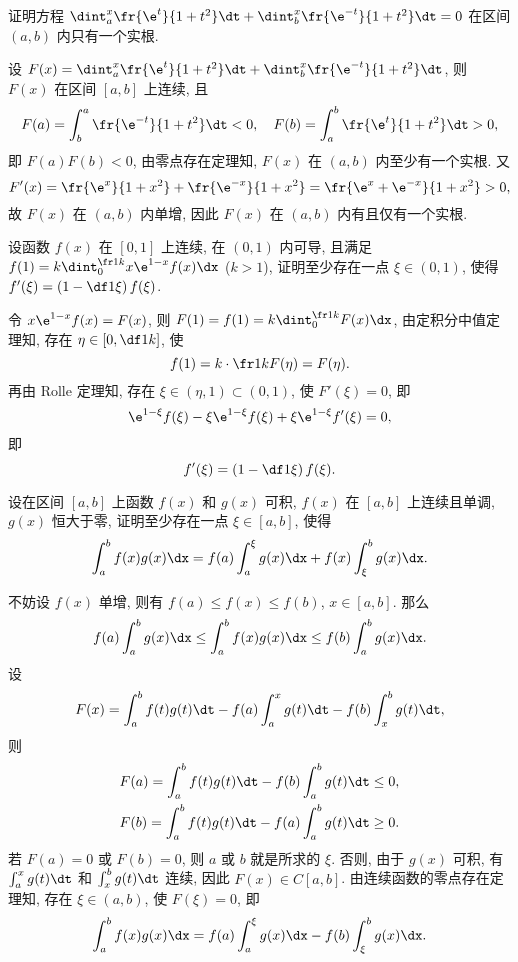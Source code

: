\documentclass{ctexart}
\begin{document}
\begin{exercise}
    证明方程 $\dint_a^x\fr{\e^t}{1+t^2}\dt+\dint_b^x\fr{\e^{-t}}{1+t^2}\dt=0$ 在区间 $(a,b)$ 内只有一个实根.
\end{exercise}

\begin{solution}
    设 $F(x)=\dint_a^x\fr{\e^t}{1+t^2}\dt+\dint_b^x\fr{\e^{-t}}{1+t^2}\dt$, 则 $F(x)$ 在区间 $[a,b]$ 上连续, 且 \[
        F(a)=\int_b^a\fr{\e^{-t}}{1+t^2}\dt<0,\quad F(b)=\int_a^b\fr{\e^t}{1+t^2}\dt>0,
    \] 即 $F(a)F(b)<0$, 由零点存在定理知, $F(x)$ 在 $(a,b)$ 内至少有一个实根. 又 \[
        F'(x)=\fr{\e^x}{1+x^2}+\fr{\e^{-x}}{1+x^2}=\fr{\e^x+\e^{-x}}{1+x^2}>0,
    \] 故 $F(x)$ 在 $(a,b)$ 内单增, 因此 $F(x)$ 在 $(a,b)$ 内有且仅有一个实根.
\end{solution}

\begin{exercise}
    设函数 $f(x)$ 在 $[0,1]$ 上连续, 在 $(0,1)$ 内可导, 且满足 $f(1)=k\dint_0^{\fr1k}x\e^{1-x}f(x)\dx$ ($k>1$), 证明至少存在一点 $\xi\in(0,1)$, 使得 $f'(\xi)=\left(1-\df1\xi\right)f(\xi)$.
\end{exercise}

\begin{solution}
    令 $x\e^{1-x}f(x)=F(x)$, 则 $F(1)=f(1)=k\dint_0^{\fr1k}F(x)\dx$, 由定积分中值定理知, 存在 $\eta\in\left[0,\df1k\right]$, 使 \[
        f(1)=k\cdot\fr1kF(\eta)=F(\eta).
    \] 再由 Rolle 定理知, 存在 $\xi\in(\eta,1)\subset(0,1)$, 使 $F'(\xi)=0$, 即 \[
        \e^{1-\xi}f(\xi)-\xi\e^{1-\xi}f(\xi)+\xi\e^{1-\xi}f'(\xi)=0,
    \] 即 \[
        f'(\xi)=\left(1-\df1\xi\right)f(\xi).
    \]
\end{solution}

\begin{exercise}
    设在区间 $[a,b]$ 上函数 $f(x)$ 和 $g(x)$ 可积, $f(x)$ 在 $[a,b]$ 上连续且单调, $g(x)$ 恒大于零, 证明至少存在一点 $\xi\in[a,b]$, 使得 \[
        \int_a^bf(x)g(x)\dx=f(a)\int_a^\xi g(x)\dx+f(x)\int_\xi^bg(x)\dx.
    \]
\end{exercise}

\begin{solution}
    不妨设 $f(x)$ 单增, 则有 $f(a)\le f(x)\le f(b)$, $x\in[a,b]$. 那么 \[
        f(a)\int_a^bg(x)\dx\le\int_a^bf(x)g(x)\dx\le f(b)\int_a^bg(x)\dx.
    \] 设 \[
        F(x)=\int_a^bf(t)g(t)\dt-f(a)\int_a^xg(t)\dt-f(b)\int_x^bg(t)\dt,
    \] 则 \[\begin{aligned}
        &F(a)=\int_a^bf(t)g(t)\dt-f(b)\int_a^bg(t)\dt\le0,\\
        &F(b)=\int_a^bf(t)g(t)\dt-f(a)\int_a^bg(t)\dt\ge0.
    \end{aligned}\] 若 $F(a)=0$ 或 $F(b)=0$, 则 $a$ 或 $b$ 就是所求的 $\xi$. 否则, 由于 $g(x)$ 可积, 有 $\int_a^xg(t)\dt$ 和 $\int_x^bg(t)\dt$ 连续, 因此 $F(x)\in C[a,b]$. 由连续函数的零点存在定理知, 存在 $\xi\in(a,b)$, 使 $F(\xi)=0$, 即 \[
        \int_a^bf(x)g(x)\dx=f(a)\int_a^\xi g(x)\dx-f(b)\int_\xi^bg(x)\dx.
    \]
\end{solution}
\end{document}
